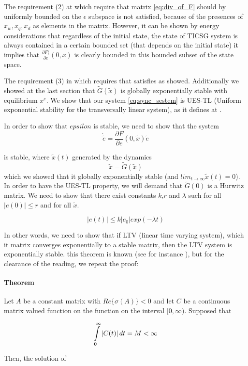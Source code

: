 \documentclass[conference]{IEEEtran}
\begin{document}
The requirement (2) at \cite{AndrieuJayawardhanaPraly} which require that matrix \eqref{eq:div_of_F} should by uniformly bounded  on the $\epsilon$ subspace is not satisfied, because of the presences of $x_{w},x_{q},x_{d}$ as elements in the matrix. However, it can be shown by energy considerations  that regardless
of the initial state, the state of TICSG system is always contained in a certain bounded set (that depends on the initial state)
it implies that $\frac{\partial F(}{\partial e}(0,x)$ is clearly bounded in this bounded subset of the state space.

The requirement (3) in \cite{AndrieuJayawardhanaPraly} which requires that  satisfies
as showed. Additionally we showed at the last section that $\tilde{G}(\tilde{x})$
is globally exponentially stable with equilibrium $x^{e}$. We 
show that our system \eqref{eq:sync_sestem} is UES-TL (Uniform exponential
stability for the transversally linear system), as it defines at \cite{AndrieuJayawardhanaPraly}. 

In order to show that $epsilon$ is stable, we need to show that the system 
$$
\dot{\tilde{e}}=\frac{\partial F}{\partial e}(0,\tilde{x})\tilde{e}
$$

is stable, where $\tilde{x}(t)$ generated by the dynamics 
$$
\tilde{x}=\tilde{G}(\tilde{x})
$$
 which we showed that it globally exponentially stable (and $lim_{t\to\infty}\tilde{x}(t)=0$).
In order to have the UES-TL property, we will demand that $\tilde{G}(0)$
is a Hurwitz matrix. We need to show that there exist constants $k$,$r$
and $\lambda$ such for all $\left|e(0)\right|\leq r$ and for all
$\tilde{x}$.

$$
\left|e(t)\right|\leq k\left|e_{0}\right|exp(-\lambda t)
$$

In other words, we need to show that if LTV (linear time varying system),
which it matrix converges exponentially to a stable matrix, then the
LTV system is exponentially stable. this theorem is known (see for instance \cite{SchovanecGilliam1999}),
but for the clearance of the reading, we  repeat the proof:
\paragraph{Theorem}
Let $A$ be a constant matrix with $Re\{\sigma(A)\}<0$ and let $C$
be a continuous matrix valued function on the function on the interval
$[0,\infty)$. Supposed that 

\[
\intop_{0}^{\infty}\left|C(t)\right|dt=M<\infty
\]

Then, the solution of 
\end{document}
